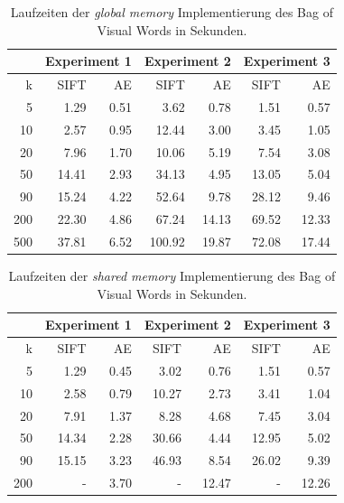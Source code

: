 \begin{table}[!htb]
    \centering
    \begin{tabular}[t]{|r|r|r|r|r|r|r|}
    \hline
	       & \multicolumn{2}{|c|}{Experiment 1} & \multicolumn{2}{|c|}{Experiment 2} & \multicolumn{2}{|c|}{Experiment 3} \\ \hline
	k    & SIFT  & AE   & SIFT   & AE    & SIFT  & AE    \\ \hline    
    5    &  1.29 & 0.51 &  3.62  &  0.78 &  1.51 &  0.57 \\ \hline
    10   &  2.57 & 0.95 &  12.44 &  3.00 &  3.45 &  1.05 \\ \hline
    20   &  7.96 & 1.70 &  10.06 &  5.19 &  7.54 &  3.08 \\ \hline
    50   & 14.41 & 2.93 &  34.13 &  4.95 & 13.05 &  5.04 \\ \hline
    90   & 15.24 & 4.22 &  52.64 &  9.78 & 28.12 &  9.46 \\ \hline
	200  & 22.30 & 4.86 &  67.24 & 14.13 & 69.52 & 12.33 \\ \hline
	500  & 37.81 & 6.52 & 100.92 & 19.87 & 72.08 & 17.44 \\ \hline
	\end{tabular}
	\caption{Laufzeiten der \textit{global memory} Implementierung des Bag of Visual Words in Sekunden.}
	\label{tab:runtimeGlobal}
\end{table}

\begin{table}
    \centering
    \begin{tabular}[t]{|r|r|r|r|r|r|r|}
    \hline
         & \multicolumn{2}{|c|}{Experiment 1} & \multicolumn{2}{|c|}{Experiment 2} & \multicolumn{2}{|c|}{Experiment 3} \\ \hline
	k    & SIFT  & AE   & SIFT   & AE    & SIFT  & AE    \\ \hline    
    5    &  1.29 & 0.45 &   3.02 &  0.76 &  1.51 &  0.57 \\ \hline
    10   &  2.58 & 0.79 &  10.27 &  2.73 &  3.41 &  1.04 \\ \hline
    20   &  7.91 & 1.37 &   8.28 &  4.68 &  7.45 &  3.04 \\ \hline
    50   & 14.34 & 2.28 &  30.66 &  4.44 & 12.95 &  5.02 \\ \hline
    90   & 15.15 & 3.23 &  46.93 &  8.54 & 26.02 &  9.39 \\ \hline
	200  & 	   - & 3.70 &      - & 12.47 & -     & 12.26 \\ \hline
	\end{tabular}
	\caption{Laufzeiten der \textit{shared memory} Implementierung des Bag of Visual Words in Sekunden.}
	\label{tab:runtimeShared}
\end{table}